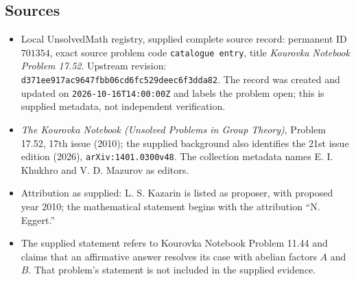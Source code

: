 \documentclass[11pt]{article}
\begin{document}
\subsection{Sources}
\begin{itemize}
\item Local UnsolvedMath registry, supplied complete source record: permanent ID \(701354\), exact source problem code \texttt{catalogue entry}, title \emph{Kourovka Notebook Problem 17.52}. Upstream revision: \texttt{d371ee917ac9647fbb06cd6fc529deec6f3dda82}. The record was created and updated on \texttt{2026-10-16T14:00:00Z} and labels the problem open; this is supplied metadata, not independent verification.
\item \emph{The Kourovka Notebook (Unsolved Problems in Group Theory)}, Problem 17.52, 17th issue (2010); the supplied background also identifies the 21st issue edition (2026), \texttt{arXiv:1401.0300v48}. The collection metadata names E. I. Khukhro and V. D. Mazurov as editors.
\item Attribution as supplied: L. S. Kazarin is listed as proposer, with proposed year 2010; the mathematical statement begins with the attribution ``N. Eggert.''
\item The supplied statement refers to Kourovka Notebook Problem 11.44 and claims that an affirmative answer resolves its case with abelian factors \(A\) and \(B\). That problem's statement is not included in the supplied evidence.
\end{itemize}
\end{document}
